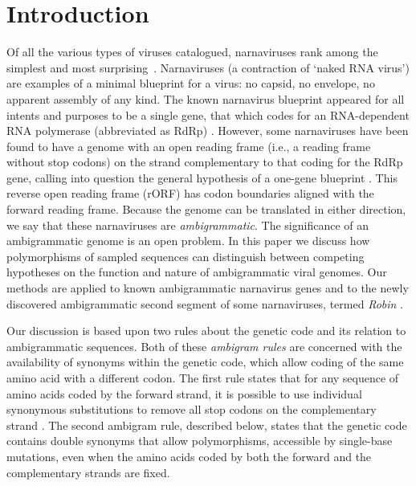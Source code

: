 \documentclass[unnumsec,webpdf,contemporary,large,namedate]{oup-authoring-template}%
\theoremstyle{thmstyleone}%
\theoremstyle{thmstyletwo}%
\theoremstyle{thmstylethree}%
\begin{document}
\maketitle


\section{Introduction}
\label{sec: 1}
Of all the various types of viruses catalogued, narnaviruses rank among the simplest
and most surprising~\citep{Cob+16}.  Narnaviruses (a contraction of \lq naked RNA virus')
are examples of a minimal blueprint for a virus: no capsid, no envelope, no apparent
assembly of any kind. The known narnavirus blueprint appeared for all intents and purposes 
to be a single gene, that which codes for an RNA-dependent RNA polymerase
(abbreviated as RdRp) \cite{Hillman2013}. However, some narnaviruses
have been found to have a genome with an open reading frame (i.e., a reading frame without
stop codons) on the strand complementary to that coding for the RdRp gene, calling into 
question the general hypothesis of a one-gene blueprint \cite{Cepelewicz2020}.
This reverse open reading frame (rORF) has codon boundaries aligned with the forward reading
frame. Because the genome can be translated in either direction, we say that these narnaviruses
are \emph{ambigrammatic}. The significance of an ambigrammatic genome is an open problem.
In this paper we discuss how polymorphisms of sampled sequences can distinguish
between competing hypotheses on the function and nature of ambigrammatic viral genomes.
Our methods are applied to known ambigrammatic narnavirus genes and to the newly
discovered ambigrammatic second segment of some narnaviruses, termed \emph{Robin} \cite{Bat+20}.

Our discussion is based upon two rules about the genetic code and its relation to ambigrammatic
sequences. Both of these \emph{ambigram rules} are concerned with the availability of synonyms within
the genetic code, which allow coding of the same amino acid with a different codon.
The first rule states that for any sequence of amino acids coded by the forward strand,
it is possible to use individual synonymous substitutions to remove
all stop codons on the complementary strand \citep[this result was discussed already in][]{DeR+19}.
The second ambigram rule, described below, states that the genetic code contains double
synonyms that allow polymorphisms, accessible by single-base mutations, even when the
amino acids coded by both the forward and the complementary strands are fixed.
\end{document}
